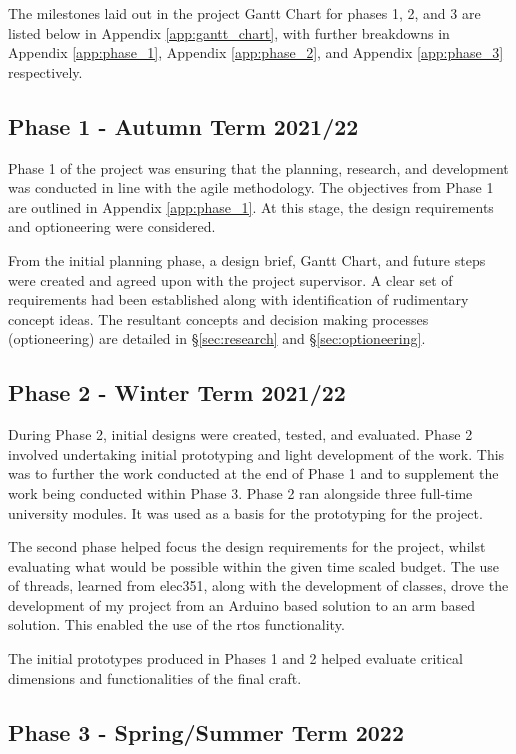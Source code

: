 \documentclass [12pt]{article}
\begin{document}
The milestones laid out in the project Gantt Chart for phases 1, 2, and 3 are listed below in Appendix \ref{app:gantt_chart}, with further breakdowns in Appendix \ref{app:phase_1}, Appendix \ref{app:phase_2}, and Appendix \ref{app:phase_3} respectively. 

\subsection{Phase 1 - Autumn Term 2021/22}\label{sec:phase_1}

Phase 1 of the project was ensuring that the planning, research, and development was conducted in line with the agile methodology. The objectives from Phase 1 are outlined in Appendix \ref{app:phase_1}. At this stage, the design requirements and optioneering were considered.  

From the initial planning phase, a design brief, Gantt Chart, and future steps were created and agreed upon with the project supervisor. A clear set of requirements had been established along with identification of rudimentary concept ideas. The resultant concepts and decision making processes (optioneering) are detailed in §\ref{sec:research} and §\ref{sec:optioneering}.  

\subsection{Phase 2 - Winter Term 2021/22}\label{sec:phase_2}

During Phase 2, initial designs were created, tested, and evaluated. Phase 2 involved undertaking initial prototyping and light development of the work. This was to further the work conducted at the end of Phase 1 and to supplement the work being conducted within Phase 3. Phase 2 ran alongside three full-time university modules. It was used as a basis for the prototyping for the project.  

The second phase helped focus the design requirements for the project, whilst evaluating what would be possible within the given time scaled budget. The use of threads, learned from \gls{elec351}, along with the development of classes, drove the development of my project from an Arduino based solution to an \gls{arm} based solution. This enabled the use of the \gls{rtos} functionality. 

The initial prototypes produced in Phases 1 and 2 helped evaluate critical dimensions and functionalities of the final craft.

\subsection{Phase 3 - Spring/Summer Term 2022} 
\end{document}
